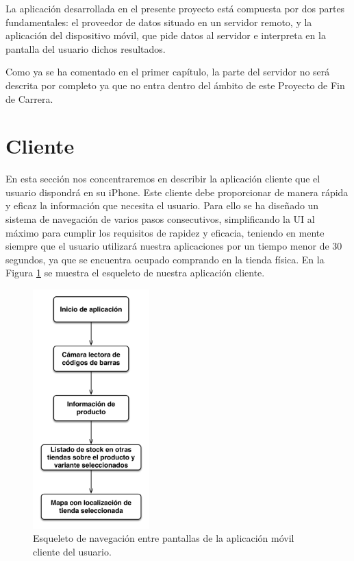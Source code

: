 
La aplicación desarrollada en el presente proyecto está compuesta por dos partes fundamentales: el proveedor de datos situado en un servidor remoto, y la aplicación del dispositivo móvil, que pide datos al servidor e interpreta en la pantalla del usuario dichos resultados.

Como ya se ha comentado en el primer capítulo, la parte del servidor no será descrita por completo ya que no entra dentro del ámbito de este Proyecto de Fin de Carrera.

\section{Cliente}
En esta sección nos concentraremos en describir la aplicación cliente que el usuario dispondrá en su iPhone. Este cliente debe proporcionar de manera rápida y eficaz la información que necesita el usuario. Para ello se ha diseñado un sistema de navegación de varios pasos consecutivos, simplificando la UI al máximo para cumplir los requisitos de rapidez y eficacia, teniendo en mente siempre que el usuario utilizará nuestra aplicaciones por un tiempo menor de 30 segundos, ya que se encuentra ocupado comprando en la tienda física. En la Figura \ref{fig:esqueleto} se muestra el esqueleto de nuestra aplicación cliente.

\begin{figure}[H]
	\centering
		\includegraphics[width=0.4\textwidth]{./img/esqueleto-app.png}
	\caption{Esqueleto de navegación entre pantallas de la aplicación móvil cliente del usuario.}
	\label{fig:esqueleto}
\end{figure}

